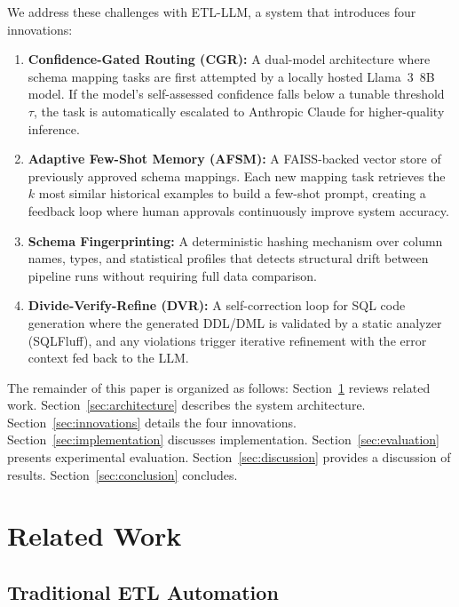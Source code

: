 \documentclass[conference]{IEEEtran}
\begin{document}
We address these challenges with \textsc{ETL-LLM}, a system that introduces
four innovations:

\begin{enumerate}
  \item \textbf{Confidence-Gated Routing (CGR):} A dual-model architecture
    where schema mapping tasks are first attempted by a locally hosted
    Llama~3~8B model. If the model's self-assessed confidence falls below a
    tunable threshold~$\tau$, the task is automatically escalated to
    Anthropic Claude for higher-quality inference.
  \item \textbf{Adaptive Few-Shot Memory (AFSM):} A FAISS-backed vector store
    of previously approved schema mappings. Each new mapping task retrieves the
    $k$ most similar historical examples to build a few-shot prompt, creating a
    feedback loop where human approvals continuously improve system accuracy.
  \item \textbf{Schema Fingerprinting:} A deterministic hashing mechanism over
    column names, types, and statistical profiles that detects structural drift
    between pipeline runs without requiring full data comparison.
  \item \textbf{Divide-Verify-Refine (DVR):} A self-correction loop for SQL
    code generation where the generated DDL/DML is validated by a static
    analyzer (SQLFluff), and any violations trigger iterative refinement with
    the error context fed back to the LLM.
\end{enumerate}

The remainder of this paper is organized as follows:
Section~\ref{sec:related} reviews related work.
Section~\ref{sec:architecture} describes the system architecture.
Section~\ref{sec:innovations} details the four innovations.
Section~\ref{sec:implementation} discusses implementation.
Section~\ref{sec:evaluation} presents experimental evaluation.
Section~\ref{sec:discussion} provides a discussion of results.
Section~\ref{sec:conclusion} concludes.

\section{Related Work}
\label{sec:related}

\subsection{Traditional ETL Automation}
\end{document}
